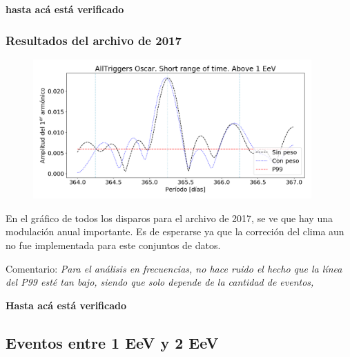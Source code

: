 {\bf hasta acá está verificado}
      \subsubsection{Resultados del archivo de 2017}

        \begin{figure}[H]
          \centering
          \includegraphics[width=0.95\textwidth]{../0_Introduccion/AllTriggers/AllTriggers_2017_Short_range_Above_1_EeV.png}
        \end{figure}
      En el gráfico de todos los disparos para el archivo de 2017, se ve que hay una modulación anual importante. Es de esperarse ya que la correción del clima aun no fue implementada para este conjuntos de datos.

      Comentario: {\sl Para el análisis en frecuencias, no hace ruido el hecho que la línea del P99 esté tan bajo, siendo que solo depende de la cantidad de eventos, }





{\bf Hasta acá está verificado}

    \subsection{Eventos entre 1 EeV y 2 EeV }
